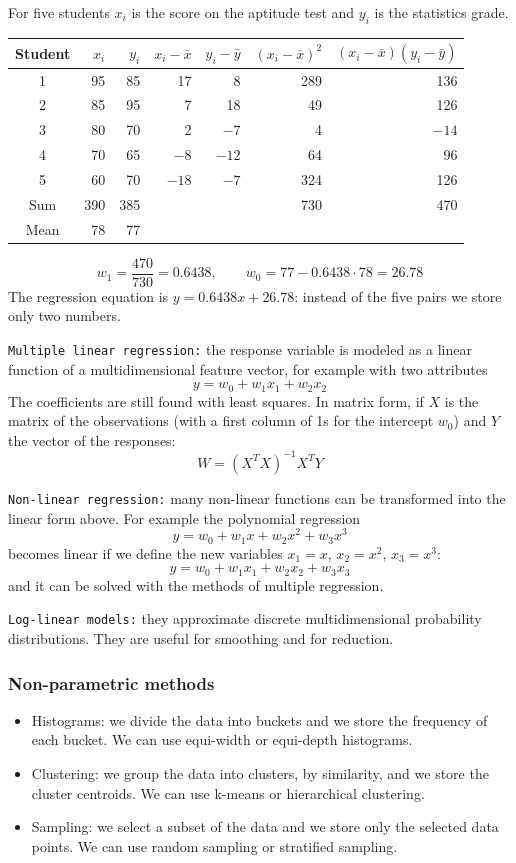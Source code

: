 \begin{example}
For five students $x_i$ is the score on the aptitude test and $y_i$ is the statistics grade.
\begin{center}
\begin{tabular}{crrrrrr}
\toprule
Student & $x_i$ & $y_i$ & $x_i-\bar{x}$ & $y_i-\bar{y}$ & $(x_i-\bar{x})^2$ & $(x_i-\bar{x})(y_i-\bar{y})$ \\
\midrule
1 & 95 & 85 & 17 & 8 & 289 & 136 \\
2 & 85 & 95 & 7 & 18 & 49 & 126 \\
3 & 80 & 70 & 2 & $-7$ & 4 & $-14$ \\
4 & 70 & 65 & $-8$ & $-12$ & 64 & 96 \\
5 & 60 & 70 & $-18$ & $-7$ & 324 & 126 \\
\midrule
Sum & 390 & 385 & & & 730 & 470 \\
Mean & 78 & 77 & & & & \\
\bottomrule
\end{tabular}
\end{center}
\[
    w_1 = \frac{470}{730} = 0.6438, \qquad w_0 = 77 - 0.6438\cdot 78 = 26.78
\]
The regression equation is $y = 0.6438x + 26.78$: instead of the five pairs we store only two numbers.
\end{example}

\texttt{Multiple linear regression:} the response variable is modeled as a linear function of a multidimensional feature vector, for example with two attributes
\[
    y = w_0 + w_1x_1 + w_2x_2
\]
The coefficients are still found with least squares. In matrix form, if $X$ is the matrix of the observations (with a first column of 1s for the intercept $w_0$) and $Y$ the vector of the responses:
\[
    W = (X^TX)^{-1}X^TY
\]

\texttt{Non-linear regression:} many non-linear functions can be transformed into the linear form above. For example the polynomial regression
\[
    y = w_0 + w_1x + w_2x^2 + w_3x^3
\]
becomes linear if we define the new variables $x_1=x$, $x_2=x^2$, $x_3=x^3$:
\[
    y = w_0 + w_1x_1 + w_2x_2 + w_3x_3
\]
and it can be solved with the methods of multiple regression.

\texttt{Log-linear models:} they approximate discrete multidimensional probability distributions. They are useful for smoothing and for reduction.

\subsubsection{Non-parametric methods}
\begin{itemize}
    \item Histograms: we divide the data into buckets and we store the frequency of each bucket. We can use equi-width or equi-depth histograms.
    \item Clustering: we group the data into clusters, by similarity, and we store the cluster centroids. We can use k-means or hierarchical clustering.
    \item Sampling: we select a subset of the data and we store only the selected data points. We can use random sampling or stratified sampling.
\end{itemize}

